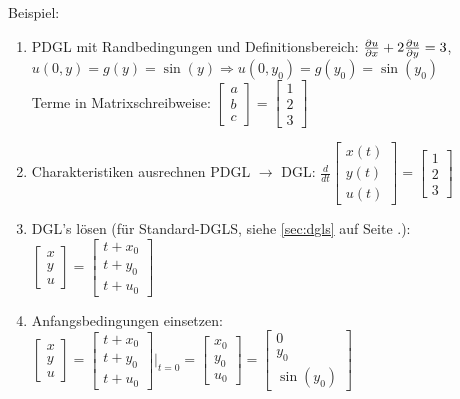 Beispiel:\\
\begin{enumerate}
	\item PDGL mit Randbedingungen und Definitionsbereich: $\frac{\partial u}{\partial x}+2\frac{\partial u}{\partial y}=3$, \; $u(0,y)=g(y)=\sin(y) \Rightarrow u(0,y_0) = g(y_0) = \sin(y_0)$\\
	Terme in Matrixschreibweise: $\begin{bmatrix}a\\b\\c\end{bmatrix}=\begin{bmatrix}1\\2\\3\end{bmatrix}$
	\item Charakteristiken ausrechnen PDGL $\rightarrow$ DGL: 	$\frac {d}{dt}\begin{bmatrix}x(t)\\y(t)\\u(t)\end{bmatrix}=\begin{bmatrix}1\\2\\3\end{bmatrix}$
	\item DGL's lösen (für Standard-DGLS, siehe \ref{sec:dgls} auf Seite \pageref{sec:dgls}.): 
	$\begin{bmatrix}x\\y\\u\end{bmatrix}=\begin{bmatrix}t+x_0\\t+y_0\\t+u_0\end{bmatrix}$
	\item Anfangsbedingungen einsetzen: $\begin{bmatrix}x\\y\\u\end{bmatrix}=\begin{bmatrix}t+x_0\\t+y_0\\t+u_0\end{bmatrix}\Bigg|_{t=0}=
	\begin{bmatrix}x_0\\y_0\\u_0\end{bmatrix}=\begin{bmatrix}0\\y_0\\\sin(y_0)\end{bmatrix}$\\

\end{enumerate}
